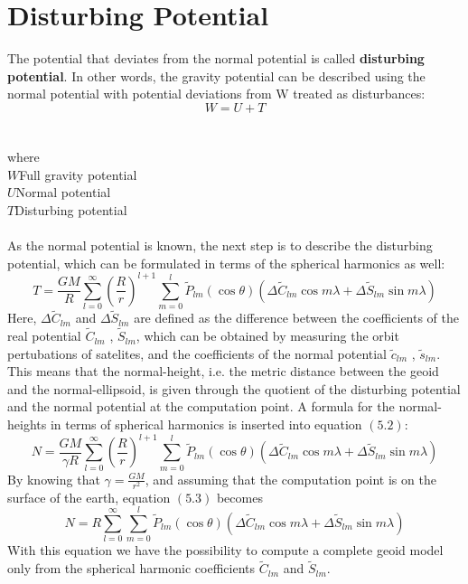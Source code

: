 \documentclass[a4paper,12pt]{report}
\newcommand\tab[1][1cm]{\hspace*{#1}}
\begin{document}
\section{Disturbing Potential}
The potential that deviates from the normal potential is called \textbf{disturbing potential}. In other words, the gravity potential can be described using the normal potential with
potential deviations from W treated as disturbances:
\begin{equation} 
W=U+T
\end{equation}
\\\\where
\\$W$\tab Full gravity potential
\\$U$\tab Normal potential
\\$T$\tab Disturbing potential
\\\\As the normal potential is known, the next step is to describe the disturbing potential, which can be formulated in terms of the spherical harmonics as well:
\begin{equation}
T=\frac{GM}{R}\sum_{l=0}^{\infty} \left(\frac{R}{r}\right)^{l+1}\sum_{m=0}^{l} \widetilde{P}_{lm}(\cos\theta)(\Delta\widetilde{C}_{lm}\cos m\lambda + \Delta\widetilde{S}_{lm}\sin m\lambda)
\end{equation}
Here, $\Delta\widetilde{C}_{lm}$ and $\Delta\widetilde{S}_{lm}$ are defined as the difference between the coefficients of the real potential $\widetilde{C}_{lm}$ , $\widetilde{S}_{lm}$, which can be obtained by measuring the orbit pertubations of satelites, and the coefficients of the normal potential $\widetilde{c}_{lm}$ , $	\widetilde{s}_{lm}$.
This means that the normal-height, i.e. the metric distance between the geoid and
the normal-ellipsoid, is given through the quotient of the disturbing potential and the
normal potential at the computation point. A formula for the normal-heights in terms
of spherical harmonics is inserted into equation $(5.2)$:
\begin{equation}
N=\frac{GM}{\gamma R}\sum_{l=0}^{\infty} \left(\frac{R}{r}\right)^{l+1}\sum_{m=0}^{l} \widetilde{P}_{lm}(\cos\theta)(\Delta\widetilde{C}_{lm}\cos m\lambda + \Delta\widetilde{S}_{lm}\sin m\lambda)
\end{equation}
By knowing that $\gamma=\frac{GM}{r^2}$, and assuming that the computation point is on the surface of the earth, equation $(5.3)$ becomes
\begin{equation}
N=R\sum_{l=0}^{\infty}\sum_{m=0}^{l} \widetilde{P}_{lm}(\cos\theta)(\Delta\widetilde{C}_{lm}\cos m\lambda + \Delta\widetilde{S}_{lm}\sin m\lambda)
\end{equation}
With this equation we have the possibility to compute a complete geoid model only from
the spherical harmonic coefficients $\widetilde{C}_{lm}$ and $\widetilde{S}_{lm}$.\\\\\\
\end{document}
